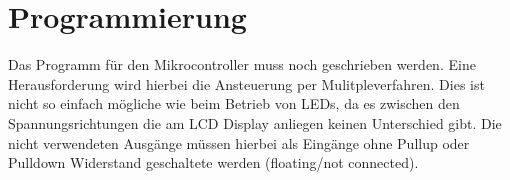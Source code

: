 \section{Programmierung}

Das Programm für den Mikrocontroller muss noch geschrieben werden. Eine Herausforderung wird hierbei die Ansteuerung per Mulitpleverfahren. Dies ist nicht so einfach mögliche wie beim Betrieb von LEDs, da es zwischen den Spannungsrichtungen die am LCD Display anliegen keinen Unterschied gibt. Die nicht verwendeten Ausgänge müssen hierbei als Eingänge ohne Pullup oder Pulldown Widerstand geschaltete werden (floating/not connected).